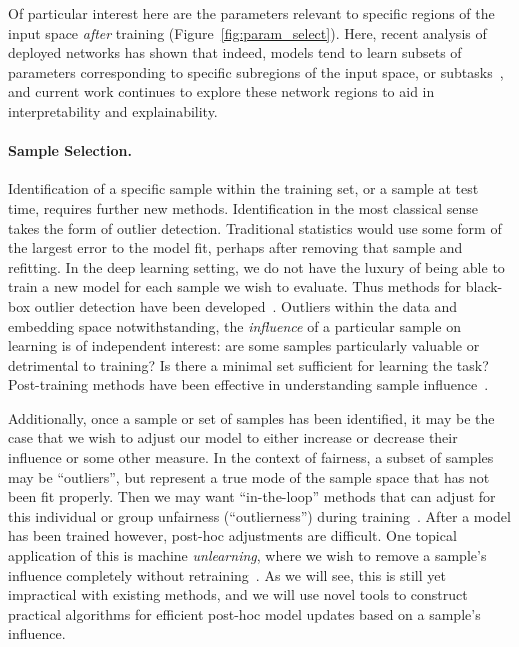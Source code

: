 Of particular interest here are the parameters relevant to specific regions of the input space \textit{after} training (Figure~\ref{fig:param_select}). Here, recent analysis of deployed networks has shown that indeed, models tend to learn subsets of parameters corresponding to specific subregions of the input space, or subtasks~\citep{bau2017network,fong2018net2vec}, and current work continues to explore these network regions to aid in interpretability and explainability.


\paragraph{Sample Selection.}
Identification of a specific sample within the training set, or a sample at test time, 
requires further new methods.
Identification in the most classical sense takes the form of outlier detection.
Traditional statistics would use some form of the largest error to the model fit,
perhaps after removing that sample and refitting.
In the deep learning setting, we do not have the luxury of 
being able to train a new model for each sample we wish to evaluate.
Thus methods for black-box outlier detection have been developed~\citep{huang2020feature,ren2019likelihood}.
Outliers within the data and embedding space notwithstanding,
the \textit{influence} of a particular sample on learning is of independent interest:
are some samples particularly valuable or detrimental to training?
Is there a minimal set sufficient for learning the task?
Post-training methods have been effective in understanding
sample influence~\citep{koh2017understanding,golatkar2020eternal,huang2020feature}.

Additionally, once a sample or set of samples has been identified,
it may be the case that we wish to adjust
our model to either increase or decrease their influence or some other measure.
In the context of fairness, a subset of samples may be ``outliers'', but
represent a true mode of the sample space that has not been fit properly.
Then we may want ``in-the-loop'' methods that can adjust
for this individual or group unfairness (``outlierness'') during training~\citep{mehrabi2021survey}.
After a model has been trained however, post-hoc adjustments are difficult.
One topical application of this is machine \textit{unlearning},
where we wish to remove a sample's influence completely without retraining~\citep{bourtoule2021machine,cao2015towards}.
As we will see, this is still yet impractical with existing methods,
and we will use novel tools to construct practical algorithms
for efficient post-hoc model updates based on a sample's influence.

